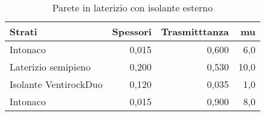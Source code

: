 \begin{table}
\centering
\caption{Parete in laterizio con isolante esterno}
\begin{tabular}{lrrr}
\toprule
                Strati & Spessori & Trasmitttanza &    mu \\
\midrule
              Intonaco &    0,015 &         0,600 &   6,0 \\
   Laterizio semipieno &    0,200 &         0,530 &  10,0 \\
 Isolante VentirockDuo &    0,120 &         0,035 &   1,0 \\
              Intonaco &    0,015 &         0,900 &   8,0 \\
\bottomrule
\end{tabular}
\end{table}
